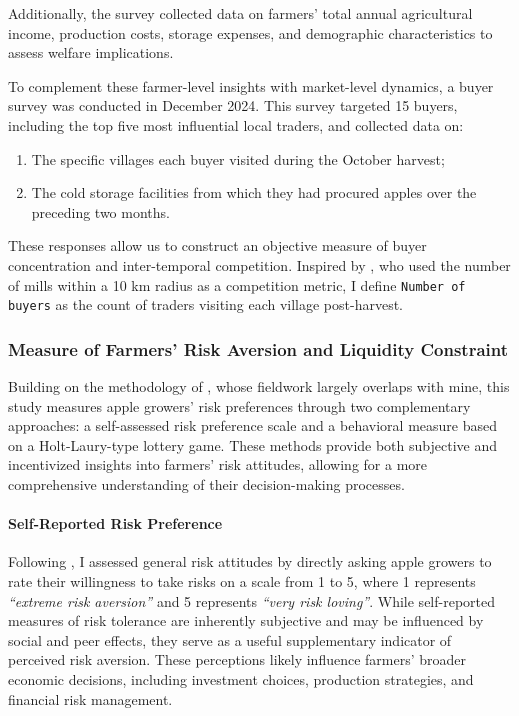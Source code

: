 \documentclass[12pt]{article}
\begin{document}
Additionally, the survey collected data on farmers' total annual agricultural income, production costs, storage expenses, and demographic characteristics to assess welfare implications.

To complement these farmer-level insights with market-level dynamics, a buyer survey was conducted in December 2024. This survey targeted 15 buyers, including the top five most influential local traders, and collected data on:
\begin{enumerate}
    \item The specific villages each buyer visited during the October harvest;
    \item The cold storage facilities from which they had procured apples over the preceding two months.
\end{enumerate}
These responses allow us to construct an objective measure of buyer concentration and inter-temporal competition. Inspired by \cite{macchiavello2021competition}, who used the number of mills within a 10 km radius as a competition metric, I define \texttt{Number of buyers} as the count of traders visiting each village post-harvest.


\subsubsection{Measure of Farmers' Risk Aversion and Liquidity Constraint}

Building on the methodology of \cite{jin2024losses}, whose fieldwork largely overlaps with mine, this study measures apple growers' risk preferences through two complementary approaches: a self-assessed risk preference scale and a behavioral measure based on a Holt-Laury-type lottery game. These methods provide both subjective and incentivized insights into farmers' risk attitudes, allowing for a more comprehensive understanding of their decision-making processes.

\paragraph{Self-Reported Risk Preference}
Following \cite{dohmen2011individual}, I assessed general risk attitudes by directly asking apple growers to rate their willingness to take risks on a scale from 1 to 5, where 1 represents \textit{``extreme risk aversion''} and 5 represents \textit{``very risk loving''}. While self-reported measures of risk tolerance are inherently subjective and may be influenced by social and peer effects, they serve as a useful supplementary indicator of perceived risk aversion. These perceptions likely influence farmers' broader economic decisions, including investment choices, production strategies, and financial risk management.
\end{document}
